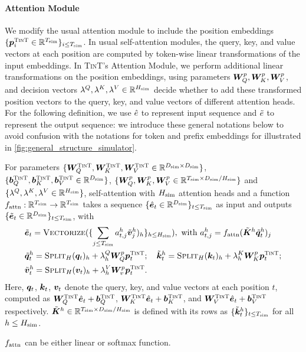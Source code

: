 \paragraph{ \simulator Attention Module} We modify the usual attention module to  include the position embeddings $\{ {{\bm{p}}}^{\textsc{TinT}}_i \in \mathbb{R}^{ T_{\text{sim}} } \}_{i \le T_{\text{sim}}  }$. 
In usual self-attention modules, the query, key, and value vectors at each position are computed by token-wise linear transformations of the input embeddings. In \textsc{TinT}'s Attention Module, we perform additional linear transformations on the position embeddings, using parameters ${\bm{W}}^p_Q, {\bm{W}}^p_K, {\bm{W}}^p_V$, and decision vectors $\lambda^Q, \lambda^K, \lambda^V \in \mathbb{R}^{H_{\text{sim}}}$ decide whether to add these transformed position vectors to the query, key, and value vectors of different attention heads.  For the following definition, we use $\Hat{e}$ to represent input sequence and $\Tilde{e}$ to represent the output sequence: we introduce these general notations below to avoid confusion with the notations for token and prefix embeddings for \simulator illustrated in \cref{fig:general_structure_simulator}.

\begin{definition}\label{def:self-attn_construct}
    For parameters $\{ {{\bm{W}}}^{\textsc{TinT}}_Q, {{\bm{W}}}^{\textsc{TinT}}_K, {{\bm{W}}}^{\textsc{TinT}}_V \in \mathbb{R}^{ D_{\text{sim}} \times D_{\text{sim}} } \}$, $\{ {{\bm{b}}}^{\textsc{TinT}}_Q, {{\bm{b}}}^{\textsc{TinT}}_K, {{\bm{b}}}^{\textsc{TinT}}_V \in \mathbb{R}^{D_{\text{sim}}} \}$, $\{ {\bm{W}}^p_Q, {\bm{W}}^p_K, {\bm{W}}^p_V \in \mathbb{R}^{ T_{\text{sim}} \times D_{\text{sim}}/H_{\text{sim}} } \}$ and $\{ \lambda^{Q},  \lambda^{K}, \lambda^{V} \in \mathbb{R}^{ H_{\text{sim}} } \}$, \simulator{} self-attention with $H_{\text{sim}}$ attention heads and a function $f_{\mathrm{attn}}: \mathbb{R}^{ T_{\text{sim}} } \to \mathbb{R}^{ T_{\text{sim}} }$ takes a sequence $\{ \Hat{\ve}_t\in\RR^ { \simu{D} }  \}_{t \le \simu{T}}$ as input and outputs $\{ \Tilde{\ve}_t \in \RR^{ \simu{D} } \}_{t \le \simu{T} }$, with 
    \begin{align*}
        &\Tilde{\ve}_t = \attmerge ( \{ \sum_{j \le \simu{T} } a^h_{t, j}  \Tilde{\vv}^{h}_j )_h \}_{h \le \simu{H} } ), \text{ with   } a^h_{t, j} =
        \attnfn ( \Tilde{\mK}^{h} \Tilde{\vq}_t^h  )_j  \\
        &\Tilde{\vq}^{h}_t = \attsplit_H (\vq_t)_h + \lambda^Q_h \mW^p_Q \simuw{\vp}_t; \quad \Tilde{\vk}^{h}_t = \attsplit_H (\vk_t)_h + \lambda^K_h \mW^p_K \simuw{\vp}_t; \\& \Tilde{\vv}^{h}_t = \attsplit_H (\vv_t)_h + \lambda^V_h \mW^p_v \simuw{\vp}_t.
    \end{align*}    
     Here, ${\bm{q}}_t$, ${\bm{k}}_t$, ${\bm{v}}_t$ denote the query, key, and value vectors at each position $t$, computed as $\simuw{\mW}_Q \Hat{\ve}_t + \simuw{\vb}_Q$, $\simuw{\mW}_K \Hat{\ve}_t + \simuw{\vb}_K$, and $\simuw{\mW}_V \Hat{\ve}_t + \simuw{\vb}_V$ respectively.
     $\Tilde{{\bm{K}}}^h \in \mathbb{R}^{ T_{\text{sim}} \times D_{\text{sim}}/H_{\text{sim}} }$ is defined with its rows as $\{\Tilde{{\bm{k}}}^h_t\}_{t \le T_{\text{sim}}}$ for all $h \le H_{\text{sim}}$.
\end{definition}

$f_{\mathrm{attn}}$ can be either linear or softmax function. 


